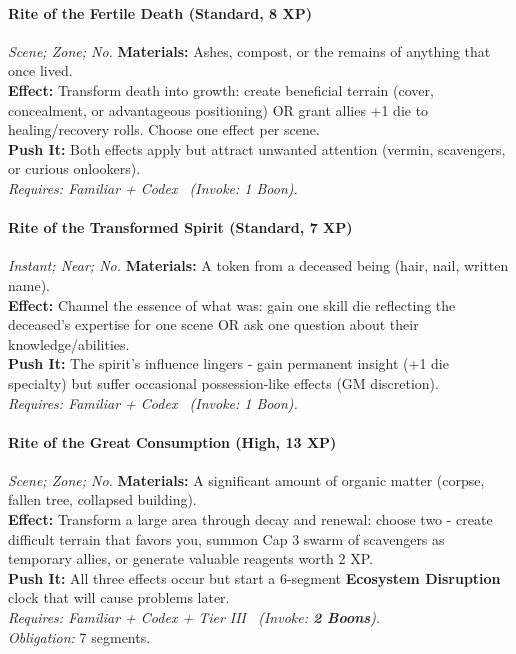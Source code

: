\paragraph{Rite of the Fertile Death (Standard, 8 XP)} \emph{Scene; Zone; No.}
\textbf{Materials:} Ashes, compost, or the remains of anything that once lived. \\
\textbf{Effect:} Transform death into growth: create beneficial terrain (cover, concealment, or advantageous positioning) OR grant allies +1 die to healing/recovery rolls. Choose one effect per scene. \\
\textbf{Push It:} Both effects apply but attract unwanted attention (vermin, scavengers, or curious onlookers). \\
\emph{Requires: Familiar + Codex \ (\textit{Invoke:} 1 Boon).}

\paragraph{Rite of the Transformed Spirit (Standard, 7 XP)} \emph{Instant; Near; No.}
\textbf{Materials:} A token from a deceased being (hair, nail, written name). \\
\textbf{Effect:} Channel the essence of what was: gain one skill die reflecting the deceased's expertise for one scene OR ask one question about their knowledge/abilities. \\
\textbf{Push It:} The spirit's influence lingers - gain permanent insight (+1 die specialty) but suffer occasional possession-like effects (GM discretion). \\
\emph{Requires: Familiar + Codex \ (\textit{Invoke:} 1 Boon).}

\paragraph{Rite of the Great Consumption (High, 13 XP)} \emph{Scene; Zone; No.}
\textbf{Materials:} A significant amount of organic matter (corpse, fallen tree, collapsed building). \\
\textbf{Effect:} Transform a large area through decay and renewal: choose two - create difficult terrain that favors you, summon Cap 3 swarm of scavengers as temporary allies, or generate valuable reagents worth 2 XP. \\
\textbf{Push It:} All three effects occur but start a 6-segment \textbf{Ecosystem Disruption} clock that will cause problems later. \\
\emph{Requires: Familiar + Codex + Tier III \ (\textit{Invoke:} \textbf{2 Boons}).} \\
\emph{Obligation:} 7 segments.


